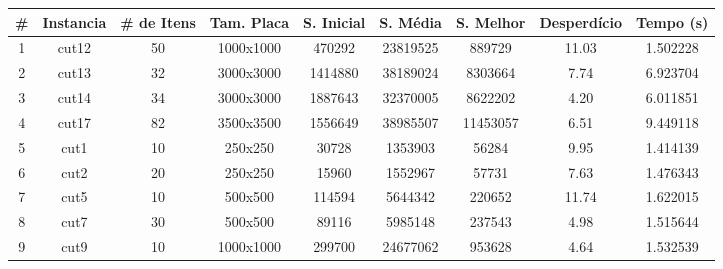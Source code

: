 
\begin{center}
    \begin{tabular}{ |c|c|c|c|c|c|c|c|c|}
    \hline
        \# & Instancia & \# de Itens & Tam. Placa & S. Inicial & S. Média & S. Melhor & Desperdício & Tempo (s) \\ \hline

1 & cut12 & 50 & 1000x1000 & 470292 & 23819525 & 889729 & 11.03 & 1.502228 \\ \hline
2 & cut13 & 32 & 3000x3000 & 1414880 & 38189024 & 8303664 & 7.74 & 6.923704 \\ \hline
3 & cut14 & 34 & 3000x3000 & 1887643 & 32370005 & 8622202 & 4.20 & 6.011851 \\ \hline
4 & cut17 & 82 & 3500x3500 & 1556649 & 38985507 & 11453057 & 6.51 & 9.449118 \\ \hline
5 & cut1 & 10 & 250x250 & 30728 & 1353903 & 56284 & 9.95 & 1.414139 \\ \hline
6 & cut2 & 20 & 250x250 & 15960 & 1552967 & 57731 & 7.63 & 1.476343 \\ \hline
7 & cut5 & 10 & 500x500 & 114594 & 5644342 & 220652 & 11.74 & 1.622015 \\ \hline
8 & cut7 & 30 & 500x500 & 89116 & 5985148 & 237543 & 4.98 & 1.515644 \\ \hline
9 & cut9 & 10 & 1000x1000 & 299700 & 24677062 & 953628 & 4.64 & 1.532539 \\ \hline

    \end{tabular}
\end{center}

